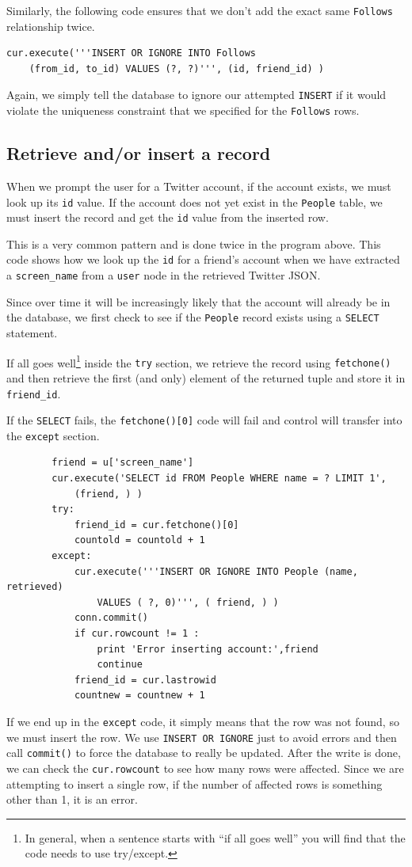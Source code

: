 Similarly, the following code ensures that we don't add the 
exact same {\tt Follows} relationship twice.

\beforeverb
\begin{verbatim}
cur.execute('''INSERT OR IGNORE INTO Follows 
    (from_id, to_id) VALUES (?, ?)''', (id, friend_id) )
\end{verbatim}
\afterverb
%
Again, we simply tell the database to ignore our attempted 
{\tt INSERT} if it would violate the uniqueness constraint
that we specified for the {\tt Follows} rows.

\subsection{Retrieve and/or insert a record}

When we prompt the user for a Twitter account, if the account 
exists, we must look up its {\tt id} value.  If the account
does not yet exist in the {\tt People} table, we must insert 
the record and get the {\tt id} value from the inserted
row.

This is a very common pattern and is done twice in the program above.
This code shows how we look up the {\tt id} for a 
friend's account when we have extracted a \verb"screen_name"
from a {\tt user} node in the retrieved Twitter JSON.

Since over time it will be increasingly likely that the account
will already be in the database, we first check to see if the
{\tt People} record exists using a {\tt SELECT} statement.

If all goes well\footnote{In general, when a sentence starts 
with ``if all goes well'' you will find that the code needs
to use try/except.} inside the {\tt try} section, we retrieve the
record using {\tt fetchone()} and then retrieve the
first (and only) element of the returned tuple and store it in 
\verb"friend_id".

If the {\tt SELECT} fails, the {\tt fetchone()[0]} code will fail
and control will transfer into the {\tt except} section.

\beforeverb
\begin{verbatim}
        friend = u['screen_name']
        cur.execute('SELECT id FROM People WHERE name = ? LIMIT 1',
            (friend, ) )
        try:
            friend_id = cur.fetchone()[0]
            countold = countold + 1
        except:
            cur.execute('''INSERT OR IGNORE INTO People (name, retrieved) 
                VALUES ( ?, 0)''', ( friend, ) )
            conn.commit()
            if cur.rowcount != 1 :
                print 'Error inserting account:',friend
                continue
            friend_id = cur.lastrowid
            countnew = countnew + 1
\end{verbatim}
\afterverb
%
If we end up in the {\tt except} code, it simply means that the row
was not found, so we must insert the row.  We use {\tt INSERT OR 
IGNORE} just to avoid errors and then call {\tt commit()} to 
force the database to really be updated.  After the write is done, we can 
check the {\tt cur.rowcount} to see how many rows were affected.  Since
we are attempting to insert a single row, if the number of 
affected rows is something other than 1, it is an error.  


